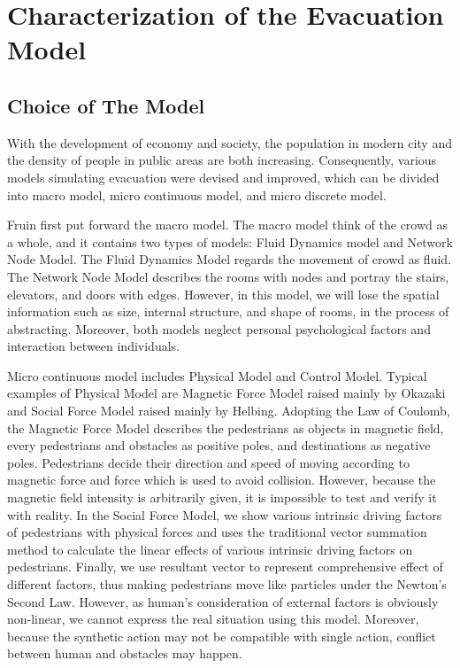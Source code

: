 \documentclass{mcmthesis}
\begin{document}
\section{Characterization of the Evacuation Model}
\subsection{Choice of The Model}
With the development of economy and society, the population in modern city and the density of people in public areas are both increasing. Consequently, various models simulating 
evacuation were devised and improved, which can be divided into macro model, micro continuous model, and micro discrete model.

Fruin first put forward the macro model. The macro model think of the crowd as a whole, and it contains two types of models: Fluid Dynamics model and Network Node Model. The Fluid Dynamics Model regards the movement of crowd as fluid. The Network Node Model describes the rooms with nodes and portray the stairs, elevators, and doors with edges. However, in this model, we will lose the spatial information such as size, internal structure, and shape of rooms, in the process of abstracting. Moreover, both models neglect personal psychological factors and interaction between individuals.

Micro continuous model includes Physical Model and Control Model. Typical examples of Physical Model are Magnetic Force Model raised mainly by Okazaki \cite{97} and Social Force Model raised mainly by Helbing. Adopting the Law of Coulomb, the Magnetic Force Model describes the pedestrians as objects in magnetic field, every pedestrians and obstacles as positive poles, and destinations as negative poles. Pedestrians decide their direction and speed of moving according to magnetic force and force which is used to avoid collision. However, because the magnetic field intensity is arbitrarily given, it is impossible to test and verify it with reality. In the Social Force Model, we show various intrinsic driving factors of pedestrians with physical forces and uses the traditional vector summation method to calculate the linear effects of various intrinsic driving factors on pedestrians. Finally, we use resultant vector to represent comprehensive effect of different factors, thus making pedestrians move like particles under the Newton’s Second Law. However, as human’s consideration of external factors is obviously non-linear, we cannot express the real situation using this model. Moreover, because the synthetic action may not be compatible with single action, conflict between human and obstacles may happen. 
\end{document}
